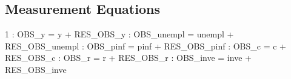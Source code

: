 \documentclass{article}%
\begin{document}
\subsection{Measurement Equations}%
\label{subsec:MeasurementEquations}%
 1    :  OBS\_y = y + RES\_OBS\_y\newline%
    :  OBS\_unempl = unempl + RES\_OBS\_unempl\newline%
    :  OBS\_pinf = pinf + RES\_OBS\_pinf\newline%
    :  OBS\_c = c + RES\_OBS\_c\newline%
    :  OBS\_r = r + RES\_OBS\_r\newline%
    :  OBS\_inve = inve + RES\_OBS\_inve\newline%

%
\end{document}
